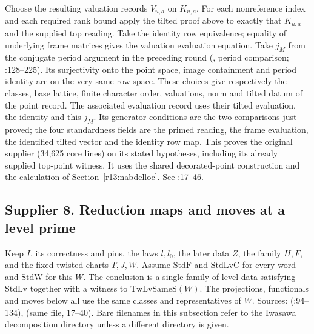 Choose the resulting valuation records $V_{u,a}$ on $K_{u,a}$. For each
nonreference index and each required rank bound apply the tilted proof
above to exactly that $K_{u,a}$ and the supplied top reading. Take the
identity row equivalence; equality of underlying frame matrices gives
the valuation evaluation equation. Take $j_M$ from the conjugate period
argument in the preceding round (, period comparison;
:128--225). Its surjectivity onto the point
space, image containment and period identity are on the very same
row space. These choices give respectively the classes, base lattice,
finite character order, valuations, norm and tilted datum of the point
record. The associated evaluation record uses their tilted evaluation,
the identity and this $j_M$. Its generator conditions are the two
comparisons just proved; the four standardness fields are the primed
reading, the frame evaluation, the identified tilted vector and the
identity row map. This proves the original supplier
(34,625 core lines) on its
stated hypotheses, including its already supplied top-point witness.
It uses the shared decorated-point construction and the
 calculation of
Section~\ref{r13:nabdelloc}. See :17--46.

\subsection{Supplier 8. Reduction maps and moves at a level prime}
\label{r12:s8}
Keep $I$, its correctness and pins, the laws $l,l_0$, the later data
$Z$, the family $H,F$, and the fixed twisted charts $T,J,W$.
Assume $\mathrm{StdF}$ and $\mathrm{StdLvC}$ for every word and
$\mathrm{StdW}$ for this $W$. The conclusion is a single family of
level data satisfying $\mathrm{StdLv}$ together with a witness to
$\mathrm{TwLvSameS}(W)$.
The projections, functionals and moves below all use the same classes
and representatives of $W$. Sources: 
(:94--134),
 (same file, 17--40).
Bare filenames in this subsection refer to the Iwasawa decomposition
directory unless a different directory is given.

